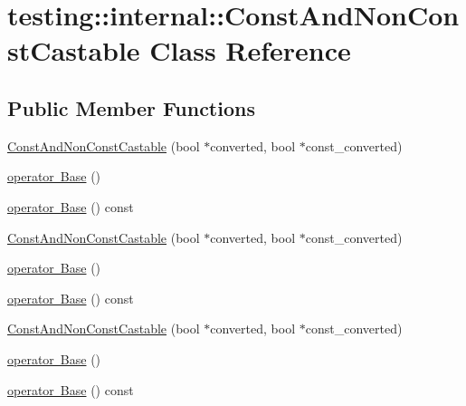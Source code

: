 \hypertarget{classtesting_1_1internal_1_1_const_and_non_const_castable}{}\section{testing\+::internal\+::Const\+And\+Non\+Const\+Castable Class Reference}
\label{classtesting_1_1internal_1_1_const_and_non_const_castable}
\subsection*{Public Member Functions}
\begin{DoxyCompactItemize}
\item 
\mbox{\hyperlink{classtesting_1_1internal_1_1_const_and_non_const_castable_aebe0ef6897b7f805e227bb969d4ee034}{Const\+And\+Non\+Const\+Castable}} (bool $\ast$converted, bool $\ast$const\+\_\+converted)
\item 
\mbox{\hyperlink{classtesting_1_1internal_1_1_const_and_non_const_castable_aff0c372d429d76d002bb29f83f2429fa}{operator Base}} ()
\item 
\mbox{\hyperlink{classtesting_1_1internal_1_1_const_and_non_const_castable_a4e8ee8051162f1dfc1da294c71481e2f}{operator Base}} () const
\item 
\mbox{\hyperlink{classtesting_1_1internal_1_1_const_and_non_const_castable_aebe0ef6897b7f805e227bb969d4ee034}{Const\+And\+Non\+Const\+Castable}} (bool $\ast$converted, bool $\ast$const\+\_\+converted)
\item 
\mbox{\hyperlink{classtesting_1_1internal_1_1_const_and_non_const_castable_aff0c372d429d76d002bb29f83f2429fa}{operator Base}} ()
\item 
\mbox{\hyperlink{classtesting_1_1internal_1_1_const_and_non_const_castable_a4e8ee8051162f1dfc1da294c71481e2f}{operator Base}} () const
\item 
\mbox{\hyperlink{classtesting_1_1internal_1_1_const_and_non_const_castable_aebe0ef6897b7f805e227bb969d4ee034}{Const\+And\+Non\+Const\+Castable}} (bool $\ast$converted, bool $\ast$const\+\_\+converted)
\item 
\mbox{\hyperlink{classtesting_1_1internal_1_1_const_and_non_const_castable_aff0c372d429d76d002bb29f83f2429fa}{operator Base}} ()
\item 
\mbox{\hyperlink{classtesting_1_1internal_1_1_const_and_non_const_castable_a4e8ee8051162f1dfc1da294c71481e2f}{operator Base}} () const
\end{DoxyCompactItemize}
